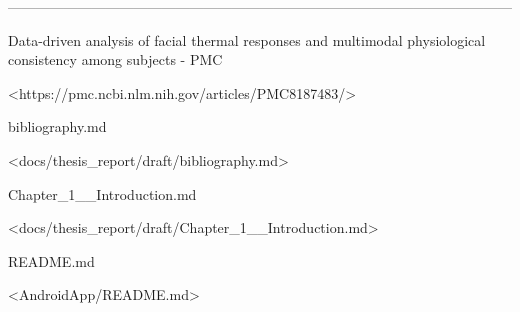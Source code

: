 ------------------------------------------------------------------------------------------------------------

\cite{ref1}
\cite{ref8}
\cite{ref9}
\cite{ref12}
Data-driven analysis of facial thermal responses and multimodal
physiological consistency among subjects - PMC

<https://pmc.ncbi.nlm.nih.gov/articles/PMC8187483/>

\cite{ref2}
\cite{ref3}
\cite{ref10}
\cite{ref11}
\cite{ref15}
bibliography.md

<docs/thesis_report/draft/bibliography.md>

\cite{ref4}
\cite{ref5}
\cite{ref6}
\cite{ref7}
\cite{ref13}
\cite{ref14}
Chapter_1\_\_Introduction.md

<docs/thesis_report/draft/Chapter_1__Introduction.md>

\cite{ref16}
README.md

<AndroidApp/README.md>
